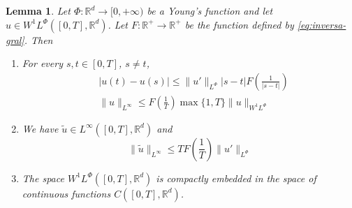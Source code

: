 \documentclass[twoside]{article}
\newtheorem{lem}[thm]{Lemma}
\theoremstyle{remark}
\newcommand{\orlnor}{\|_{L^{\Phi}}}
\newcommand{\linf}{\|_{L^{\infty}}}
\newcommand{\lphi}{L^{\Phi}}
\newcommand{\wphi}{W^{1}\lphi}
\newcommand{\sobnor}{\|_{W^{1}\lphi}}
\newcommand{\rr}{\mathbb{R}}
\renewcommand{\leq}{\leqslant}
\begin{document}
\begin{lem}\label{inclusion orlicz} Let $\Phi:\rr^d\to [0,+\infty)$ be a Young's 
function and let $u\in\wphi([0,T],\rr^d)$. Let 
$F: \rr^+ \to \rr^+$ be the function defined by \eqref{eq:inversa-gral}. Then 
\begin{enumerate}
\item\label{inclusion orlicz_item1} For every $s,t\in [0,T]$, $s\neq t$,
\begin{align}
 &|u(t)-u(s)| \leq
 \|u'\orlnor |s-t|F\left(\frac{1}{|s-t|}\right)\tag{Morrey's inequality}\label{in-sob-cont}
\\
& \| u\linf \leq F\left(\frac{1}{T}\right)\max\{1,T\}\|u\sobnor\tag{Sobolev's inequality}\label{sobolev}
\end{align}
\item We have $\widetilde{u}\in L^{\infty}([0,T],\rr^d)$ and
\[
\|\widetilde u \linf \leq T F\left(\frac{1}{T}\right)\|u'\orlnor
\tag{Sobolev-Wirtinger's inequality}\label{wirtinger}
\]
\item\label{it:embeding} The space $\wphi([0,T],\rr^d)$ is compactly embedded in the space of continuous functions $C([0,T],\rr^d)$.
\end{enumerate}
\end{lem}
\end{document}
